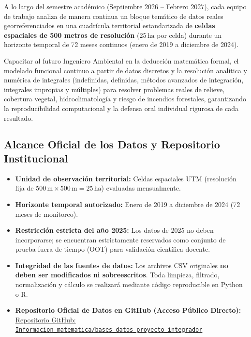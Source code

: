 \documentclass[11pt,a4paper]{article}
\begin{document}
A lo largo del semestre académico (Septiembre 2026 -- Febrero 2027), cada equipo de trabajo analiza de manera continua un bloque temático de datos reales georreferenciados en una cuadrícula territorial estandarizada de \textbf{celdas espaciales de 500 metros de resolución} ($25\,\text{ha}$ por celda) durante un horizonte temporal de 72 meses continuos (enero de 2019 a diciembre de 2024).

\begin{conceptbox}[title=Propósito Formativo del Proyecto Integrador]
Capacitar al futuro Ingeniero Ambiental en la deducción matemática formal, el modelado funcional continuo a partir de datos discretos y la resolución analítica y numérica de integrales (indefinidas, definidas, métodos avanzados de integración, integrales impropias y múltiples) para resolver problemas reales de relieve, cobertura vegetal, hidroclimatología y riesgo de incendios forestales, garantizando la reproducibilidad computacional y la defensa oral individual rigurosa de cada resultado.
\end{conceptbox}

\subsection{Alcance Oficial de los Datos y Repositorio Institucional}
\begin{itemize}[leftmargin=*,itemsep=1.5pt]
  \item \textbf{Unidad de observación territorial:} Celdas espaciales UTM (resolución fija de $500\,\text{m} \times 500\,\text{m} = 25\,\text{ha}$) evaluadas mensualmente.
  \item \textbf{Horizonte temporal autorizado:} Enero de 2019 a diciembre de 2024 (72 meses de monitoreo).
  \item \textbf{Restricción estricta del año 2025:} Los datos de 2025 no deben incorporarse; se encuentran estrictamente reservados como conjunto de prueba fuera de tiempo (OOT) para validación científica docente.
  \item \textbf{Integridad de las fuentes de datos:} Los archivos CSV originales \textbf{no deben ser modificados ni sobreescritos}. Toda limpieza, filtrado, normalización y cálculo se realizará mediante código reproducible en Python o R.
  \item \textbf{Repositorio Oficial de Datos en GitHub (Acceso Público Directo):} \\
  \href{https://github.com/cguillermo79/Informacion_matematica/tree/main/bases_datos_proyecto_integrador}{Repositorio GitHub: \texttt{Informacion\_matematica/bases\_datos\_proyecto\_integrador}}
\end{itemize}
\end{document}
